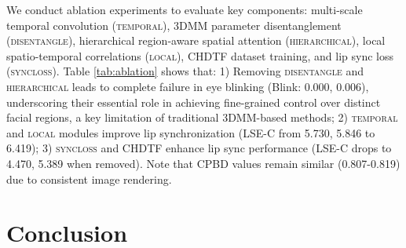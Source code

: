 \documentclass[conference]{IEEEtran}
\begin{document}
\begin{table}[t!]
  \centering
  \caption{Ablation study of different components in our method. }
  \label{tab:ablation}
\end{table}

 We conduct ablation experiments to evaluate key components: multi-scale temporal convolution (\textsc{temporal}), 3DMM parameter disentanglement (\textsc{disentangle}), hierarchical region-aware spatial attention (\textsc{hierarchical}), local spatio-temporal correlations (\textsc{local}), \textsc{CHDTF} dataset training, and lip sync loss (\textsc{syncloss}). Table \ref{tab:ablation} shows that: 1) Removing \textsc{disentangle} and \textsc{hierarchical} leads to complete failure in eye blinking (Blink: 0.000, 0.006), underscoring their essential role in achieving fine-grained control over distinct facial regions, a key limitation of traditional 3DMM-based methods; 2) \textsc{temporal} and \textsc{local} modules improve lip synchronization (LSE-C from 5.730, 5.846 to 6.419); 3) \textsc{syncloss} and \textsc{CHDTF} enhance lip sync performance (LSE-C drops to 4.470, 5.389 when removed). Note that CPBD values remain similar (0.807-0.819) due to consistent image rendering.


\section{Conclusion}
\end{document}
